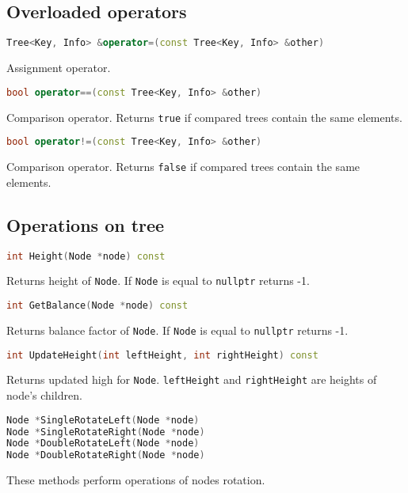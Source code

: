 \documentclass{article}
\begin{document}
\subsection{Overloaded operators}

\begin{lstlisting}[language=C++]
Tree<Key, Info> &operator=(const Tree<Key, Info> &other)
\end{lstlisting}
Assignment operator.

\begin{lstlisting}[language=C++]
bool operator==(const Tree<Key, Info> &other)
\end{lstlisting}
Comparison operator. Returns {\tt true} if compared trees contain the same elements.

\begin{lstlisting}[language=C++]
bool operator!=(const Tree<Key, Info> &other)
\end{lstlisting}
Comparison operator. Returns {\tt false} if compared trees contain the same elements.
\newpage

\subsection{Operations on tree}

\begin{lstlisting}[language=C++]
int Height(Node *node) const
\end{lstlisting}
Returns height of {\tt Node}. If {\tt Node} is equal to {\tt nullptr} returns -1.

\begin{lstlisting}[language=C++]
int GetBalance(Node *node) const
\end{lstlisting}
Returns balance factor of {\tt Node}. If {\tt Node} is equal to {\tt nullptr} returns -1.

\begin{lstlisting}[language=C++]
int UpdateHeight(int leftHeight, int rightHeight) const
\end{lstlisting}
Returns updated high for {\tt Node}. {\tt leftHeight} and {\tt rightHeight} are heights
of node's children.

\begin{lstlisting}[language=C++]
Node *SingleRotateLeft(Node *node)
Node *SingleRotateRight(Node *node)
Node *DoubleRotateLeft(Node *node)
Node *DoubleRotateRight(Node *node)
\end{lstlisting}
These methods perform operations of nodes rotation.
\end{document}
